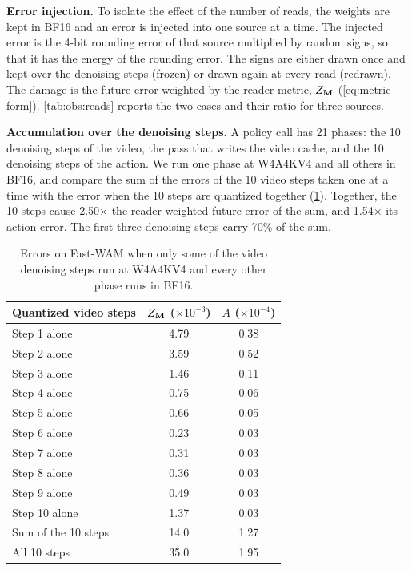 \noindent\textbf{Error injection.}
To isolate the effect of the number of reads, the weights are kept in BF16 and an error is injected into one source at a time.
The injected error is the 4-bit rounding error of that source multiplied by random signs, so that it has the energy of the rounding error.
The signs are either drawn once and kept over the denoising steps (frozen) or drawn again at every read (redrawn).
The damage is the future error weighted by the reader metric, $Z_{\mathbf{M}}$ (\cref{eq:metric-form}).
\cref{tab:obs:reads} reports the two cases and their ratio for three sources.

\noindent\textbf{Accumulation over the denoising steps.}
A policy call has 21 phases: the 10 denoising steps of the video, the pass that writes the video cache, and the 10 denoising steps of the action.
We run one phase at W4A4KV4 and all others in BF16, and compare the sum of the errors of the 10 video steps taken one at a time with the error when the 10 steps are quantized together (\cref{tab:supp:steps}).
Together, the 10 steps cause 2.50$\times$ the reader-weighted future error of the sum, and 1.54$\times$ its action error.
The first three denoising steps carry 70\% of the sum.

\begin{table}[t]
  \centering
  \small
  \setlength{\tabcolsep}{5pt}
  \begin{tabular}{@{}lcc@{}}
    \toprule
    Quantized video steps & $Z_{\mathbf{M}}$ ($\times 10^{-3}$) & $A$ ($\times 10^{-4}$) \\
    \midrule
    Step 1 alone  & 4.79 & 0.38 \\
    Step 2 alone  & 3.59 & 0.52 \\
    Step 3 alone  & 1.46 & 0.11 \\
    Step 4 alone  & 0.75 & 0.06 \\
    Step 5 alone  & 0.66 & 0.05 \\
    Step 6 alone  & 0.23 & 0.03 \\
    Step 7 alone  & 0.31 & 0.03 \\
    Step 8 alone  & 0.36 & 0.03 \\
    Step 9 alone  & 0.49 & 0.03 \\
    Step 10 alone & 1.37 & 0.03 \\
    \midrule
    Sum of the 10 steps & 14.0 & 1.27 \\
    All 10 steps        & 35.0 & 1.95 \\
    \bottomrule
  \end{tabular}
  \caption{Errors on Fast-WAM when only some of the video denoising steps run at W4A4KV4 and every other phase runs in BF16.}
  \label{tab:supp:steps}
\end{table}

